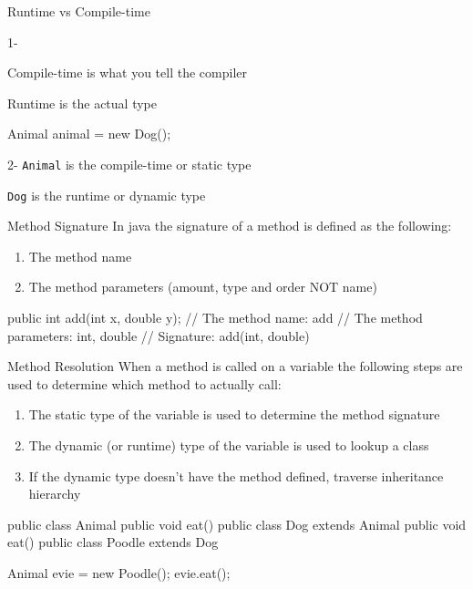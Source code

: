 \documentclass[week3]{csse2002}
\begin{document}

\begin{topic}{Runtime vs Compile-time}
\begin{subtopic}{1-}

Compile-time is what you tell the compiler

Runtime is the actual type

\begin{java}
Animal animal = new Dog();
\end{java}
\end{subtopic}

\begin{subtopic}{2-}
\texttt{Animal} is the compile-time or static type

\texttt{Dog} is the runtime or dynamic type
\end{subtopic}
\end{topic}

\begin{topic}{Method Signature}
In java the signature of a method is defined as the following:
\begin{enumerate}
	\item The method name
	\item The method parameters (amount, type and order NOT name)
\end{enumerate}

\begin{java}
public int add(int x, double y);
// The method name: add
// The method parameters: int, double
// Signature: add(int, double)
\end{java}
\end{topic}

\begin{topic}{Method Resolution}
When a method is called on a variable the following steps are used to determine
which method to actually call:
\begin{enumerate}
	\item The static type of the variable is used to determine the method signature
	\item The dynamic (or runtime) type of the variable is used to lookup a class
	\item If the dynamic type doesn't have the method defined, traverse inheritance hierarchy
\end{enumerate}

\begin{java}
public class Animal {
	public void eat() {}
}
public class Dog extends Animal {
	public void eat() {}
}
public class Poodle extends Dog {}

Animal evie = new Poodle();
evie.eat();
\end{java}
\end{topic}
\end{document}
